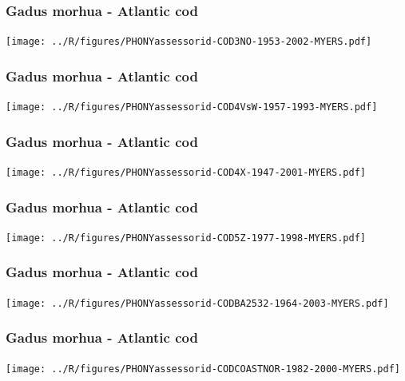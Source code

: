 \subsubsection{Gadus morhua - Atlantic cod}
\begin{center}
\texttt{[image: ../R/figures/PHONYassessorid-COD3NO-1953-2002-MYERS.pdf]}
\end{center}

\subsubsection{Gadus morhua - Atlantic cod}
\begin{center}
\texttt{[image: ../R/figures/PHONYassessorid-COD4VsW-1957-1993-MYERS.pdf]}
\end{center}

\subsubsection{Gadus morhua - Atlantic cod}
\begin{center}
\texttt{[image: ../R/figures/PHONYassessorid-COD4X-1947-2001-MYERS.pdf]}
\end{center}

\subsubsection{Gadus morhua - Atlantic cod}
\begin{center}
\texttt{[image: ../R/figures/PHONYassessorid-COD5Z-1977-1998-MYERS.pdf]}
\end{center}

\subsubsection{Gadus morhua - Atlantic cod}
\begin{center}
\texttt{[image: ../R/figures/PHONYassessorid-CODBA2532-1964-2003-MYERS.pdf]}
\end{center}

\subsubsection{Gadus morhua - Atlantic cod}
\begin{center}
\texttt{[image: ../R/figures/PHONYassessorid-CODCOASTNOR-1982-2000-MYERS.pdf]}
\end{center}

